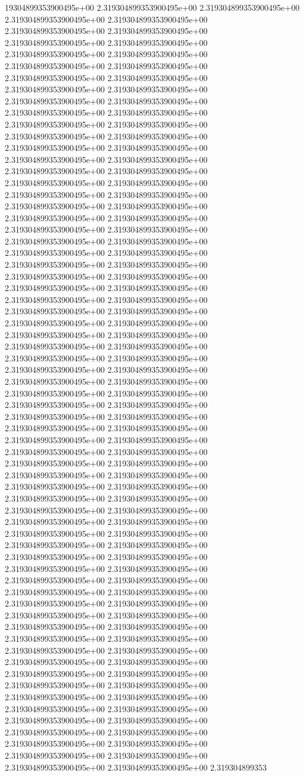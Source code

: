 19304899353900495e+00	2.319304899353900495e+00	2.319304899353900495e+00	2.319304899353900495e+00	2.319304899353900495e+00	2.319304899353900495e+00	2.319304899353900495e+00	2.319304899353900495e+00	2.319304899353900495e+00	2.319304899353900495e+00	2.319304899353900495e+00	2.319304899353900495e+00	2.319304899353900495e+00	2.319304899353900495e+00	2.319304899353900495e+00	2.319304899353900495e+00	2.319304899353900495e+00	2.319304899353900495e+00	2.319304899353900495e+00	2.319304899353900495e+00	2.319304899353900495e+00	2.319304899353900495e+00	2.319304899353900495e+00	2.319304899353900495e+00	2.319304899353900495e+00	2.319304899353900495e+00	2.319304899353900495e+00	2.319304899353900495e+00	2.319304899353900495e+00	2.319304899353900495e+00	2.319304899353900495e+00	2.319304899353900495e+00	2.319304899353900495e+00	2.319304899353900495e+00	2.319304899353900495e+00	2.319304899353900495e+00	2.319304899353900495e+00	2.319304899353900495e+00	2.319304899353900495e+00	2.319304899353900495e+00	2.319304899353900495e+00	2.319304899353900495e+00	2.319304899353900495e+00	2.319304899353900495e+00	2.319304899353900495e+00	2.319304899353900495e+00	2.319304899353900495e+00	2.319304899353900495e+00	2.319304899353900495e+00	2.319304899353900495e+00	2.319304899353900495e+00	2.319304899353900495e+00	2.319304899353900495e+00	2.319304899353900495e+00	2.319304899353900495e+00	2.319304899353900495e+00	2.319304899353900495e+00	2.319304899353900495e+00	2.319304899353900495e+00	2.319304899353900495e+00	2.319304899353900495e+00	2.319304899353900495e+00	2.319304899353900495e+00	2.319304899353900495e+00	2.319304899353900495e+00	2.319304899353900495e+00	2.319304899353900495e+00	2.319304899353900495e+00	2.319304899353900495e+00	2.319304899353900495e+00	2.319304899353900495e+00	2.319304899353900495e+00	2.319304899353900495e+00	2.319304899353900495e+00	2.319304899353900495e+00	2.319304899353900495e+00	2.319304899353900495e+00	2.319304899353900495e+00	2.319304899353900495e+00	2.319304899353900495e+00	2.319304899353900495e+00	2.319304899353900495e+00	2.319304899353900495e+00	2.319304899353900495e+00	2.319304899353900495e+00	2.319304899353900495e+00	2.319304899353900495e+00	2.319304899353900495e+00	2.319304899353900495e+00	2.319304899353900495e+00	2.319304899353900495e+00	2.319304899353900495e+00	2.319304899353900495e+00	2.319304899353900495e+00	2.319304899353900495e+00	2.319304899353900495e+00	2.319304899353900495e+00	2.319304899353900495e+00	2.319304899353900495e+00	2.319304899353900495e+00	2.319304899353900495e+00	2.319304899353900495e+00	2.319304899353900495e+00	2.319304899353900495e+00	2.319304899353900495e+00	2.319304899353900495e+00	2.319304899353900495e+00	2.319304899353900495e+00	2.319304899353900495e+00	2.319304899353900495e+00	2.319304899353900495e+00	2.319304899353900495e+00	2.319304899353900495e+00	2.319304899353900495e+00	2.319304899353900495e+00	2.319304899353900495e+00	2.319304899353900495e+00	2.319304899353900495e+00	2.319304899353900495e+00	2.319304899353900495e+00	2.319304899353900495e+00	2.319304899353900495e+00	2.319304899353900495e+00	2.319304899353900495e+00	2.319304899353900495e+00	2.319304899353900495e+00	2.319304899353900495e+00	2.319304899353900495e+00	2.319304899353900495e+00	2.319304899353900495e+00	2.319304899353900495e+00	2.319304899353900495e+00	2.319304899353900495e+00	2.319304899353